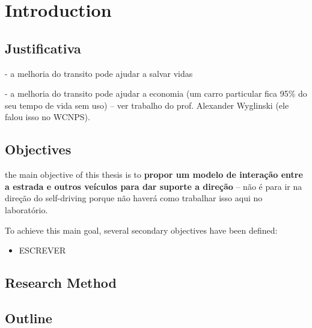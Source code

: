 \chapter{Introduction} \label{chap:introduction}


\section{Justificativa}

- a melhoria do transito pode ajudar a salvar vidas

- a melhoria do transito pode ajudar a economia (um carro particular fica 95\% do seu tempo de vida sem uso) -- ver trabalho do prof. Alexander Wyglinski (ele falou isso no WCNPS).




\section{Objectives}


the main objective of this thesis is to
\textbf{
propor um modelo de interação entre a estrada e outros veículos para dar suporte a direção
}
-- não é para ir na direção do self-driving porque não haverá como trabalhar isso aqui no laboratório.


To achieve this main goal, several secondary objectives have been defined:


\begin{itemize}
    \item ESCREVER

\end{itemize}



\section{Research Method}  \label{sec:intro-method}




\section{Outline} \label{sec:intro-outline}

